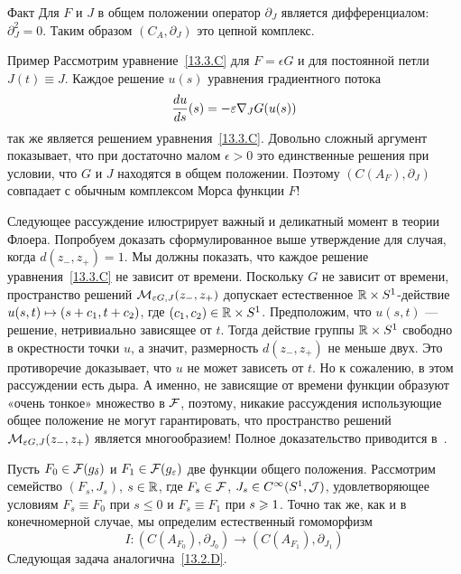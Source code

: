 \begin{thm}{Факт}\label{13.3.F}
  Для $F$ и $J$ в общем положении оператор $\partial_{J}$ является
  дифференциалом: $\partial_{J}^{2}=0$.
  Таким образом $(C_{A},\partial_{J})$ это цепной комплекс.
\end{thm}

\begin{thm}{Пример}\label{13.3.G}
  Рассмотрим уравнение~\ref{13.3.C} для $F = \epsilon G$ и для
  постоянной петли $J(t)\equiv J$.
  Каждое решение $u(s)$ уравнения градиентного потока
  \[
  \frac{d u}{d s} (s) = -\varepsilon\nabla_{J} G(u(s))
  \]
  так же является решением уравнения~\ref{13.3.C}.
  Довольно сложный аргумент \cite[Lemma 7.1]{HS} показывает, что при
  достаточно малом $\epsilon>0$ это единственные решения при
  условии, что $G$ и $J$ находятся в общем положении.
  Поэтому $(C(A_{F}),\partial_{J})$ совпадает с обычным комплексом
  Морса функции $F$!
\end{thm}

Следующее рассуждение илюстрирует важный и деликатный
момент в теории Флоера.
Попробуем доказать сформулированное выше утверждение для случая, когда
$d(z_{-}, z_{+})=1$.  
Мы должны показать, что каждое решение уравнения~\ref{13.3.C} не
зависит от времени.
Поскольку $G$ не зависит от времени, пространство решений
$\mathcal{M}_{\varepsilon G,J}(z_{-},z_{+})$ допускает естественное $\mathbb{R}\times
S^{1}$-действие $u(s, t) \mapsto (s\z+c_{1},t+c_{2})$, где
$(c_{1},c_{2})\in\mathbb{R}\times S^{1}$.
Предположим, что $u(s, t)$ — решение, нетривиально зависящее от $t$.
Тогда действие группы $\mathbb{R}\times S^{1}$ свободно в окрестности точки $u$,
а значит, размерность $d(z_{-}, z_{+})$ не меньше двух.
Это противоречие доказывает, что $u$ не может зависеть от $t$.
Но к сожалению, в этом рассуждении есть дыра.
А именно, не зависящие от времени функции образуют «очень тонкое»
множество в $\mathcal{F}$, поэтому, никакие рассуждения использующие общее
положение не могут гарантировать, что пространство решений
$\mathcal{M}_{\varepsilon G,J}(z_{-}, z_{+})$ является многообразием!
Полное доказательство приводится в~\cite{HS}.

Пусть $F_{0}\in\mathcal{F}(g_{\delta})$ и $F_{1}\in\mathcal{F}(g_{\varepsilon})$ две
функции общего положения. 
Рассмотрим семейство $(F_{s}, J_{s})$, $s\in\mathbb{R}$, где
$F_{s}\in\mathcal{F}$, $J_{s}\in C^{\infty}(S^{1},\mathcal{J})$, удовлетворяющее
условиям 
$F_{s}\equiv F_{0}$ при $s\le0$ и $F_{s}\equiv F_{1}$ при $s\z\ge1$.
Точно так же, как и в конечномерной случае, мы определим
естественный гомоморфизм
\[
I:(C(A_{F_{0}}),\partial_{J_{0}})\to(C(A_{F_{1}}),\partial_{J_{1}})
\]
Следующая задача аналогична~\ref{13.2.D}.

